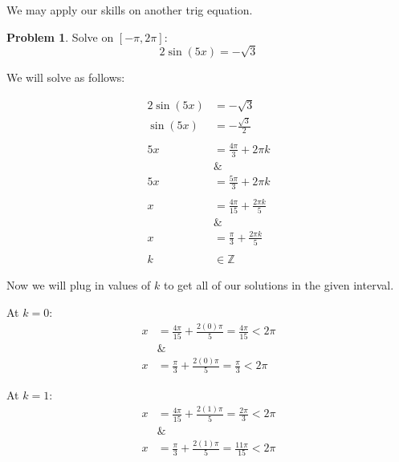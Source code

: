 \documentclass[12pt]{article}
\theoremstyle{definition}
\newtheorem{problem}{Problem}
\begin{document}
We may apply our skills on another trig equation.

\begin{problem}
Solve on $\displaystyle [-\pi, 2\pi]$:
\begin{equation*}
    2\sin(5x) = -\sqrt{3} \label{eq:3}
\end{equation*}
\end{problem}

We will solve as follows:

\begin{align}
    2\sin(5x) & = -\sqrt{3}                          \\
    \sin(5x)  & = -\frac{\sqrt{3}}{2}                \\
    \nonumber                                        \\
    5x        & = \frac{4\pi}{3} + 2\pi k            \\
    \nonumber & \&                                   \\
    5x        & = \frac{5\pi}{3} + 2\pi k            \\
    \nonumber                                        \\
    x         & = \frac{4\pi}{15} + \frac{2\pi k}{5} \\
    \nonumber & \&                                   \\
    x         & = \frac{\pi}{3} + \frac{2\pi k}{5}   \\
    \nonumber                                        \\
    k         & \in \mathbb{Z}
\end{align}

Now we will plug in values of $k$ to get all of our solutions in the given interval.

At $k=0$:
\begin{align}
    x         & =\frac{4\pi}{15} + \frac{2(0)\pi}{5} = \frac{4\pi}{15} < 2\pi \\
    \nonumber & \&                                                            \\
    x         & =\frac{\pi}{3} + \frac{2(0)\pi}{5} = \frac{\pi}{3} < 2\pi
\end{align}

At $k=1$:
\begin{align}
    x         & =\frac{4\pi}{15} + \frac{2(1)\pi}{5} = \frac{2\pi}{3} < 2\pi \\
    \nonumber & \&                                                           \\
    x         & =\frac{\pi}{3} + \frac{2(1)\pi}{5} = \frac{11\pi}{15} < 2\pi
\end{align}
\end{document}
